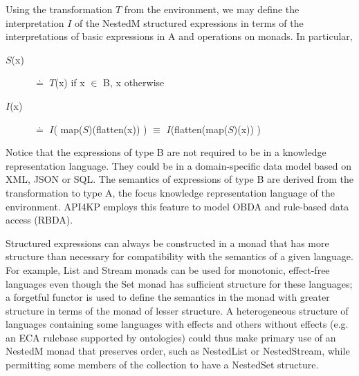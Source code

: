 \documentclass[runningheads]{llncs}
\begin{document}
Using the transformation $T$ from the environment, we may define the interpretation $I$ of the NestedM structured expressions in terms of the interpretations of basic expressions in A and operations on monads. In particular,
\begin{description}
\item[$S$(x)] $\doteq$ $T$(x) if x $\in$ B, x otherwise
\item[$I$(x)] $\doteq$ $I$( map($S$)(flatten(x)) ) $\equiv$ $I$(flatten(map($S$)(x)) )
\end{description}
Notice that the expressions of type B are not required to be in a knowledge representation language. They could be in a domain-specific data model based on XML, JSON or SQL. The semantics of expressions of type B are derived from the transformation to type A, the focus  knowledge representation language of the environment. API4KP employs this feature to model OBDA and rule-based data access (RBDA).

Structured expressions can always be constructed in a monad that has more structure than necessary for compatibility with the semantics of a given language.
For example, List and Stream monads can be used for monotonic, effect-free languages even though the Set monad has sufficient structure for these languages;
a forgetful functor is used to define the semantics in the monad with greater structure in terms of the monad of lesser structure.
A heterogeneous structure of languages containing some languages with effects and others without effects (e.g. an ECA rulebase supported by ontologies) could thus make primary use of an NestedM monad that preserves order, such as NestedList or NestedStream, while permitting some members of the collection to have a NestedSet structure. 
\end{document}
